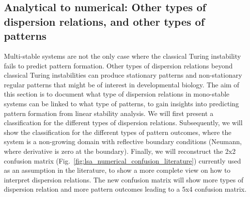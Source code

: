 \subsection{Analytical to numerical: Other types of dispersion relations, and other types of patterns} \label{nogrowth}
Multi-stable systems are not the only case where the classical Turing instability fails to predict pattern formation.
Other types of dispersion relations beyond classical Turing instabilities can produce stationary patterns and non-stationary regular patterns that might be of interest in developmental biology.
The aim of this section is to document what type of dispersion relations in mono-stable systems can be linked to what type of patterns, to gain insights into predicting pattern formation from linear stability analysis.
We will first present a classification for the different types of dispersion relations.
Subsequently, we will show the classification for the different types of pattern outcomes, where the system is a non-growing domain with reflective boundary conditions (Neumann, where derivative is zero at the boundary).
Finally, we will reconstruct the 2x2 confusion matrix (Fig.~\ref{fig:lsa_numerical_confusion_literature}) currently used as an assumption in the literature, to show a more complete view on how to interpret dispersion relations.
The new confusion matrix will show more types of dispersion relation and more pattern outcomes leading to a 5x4 confusion matrix.

